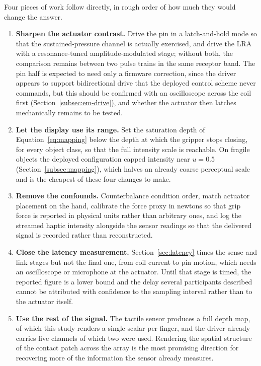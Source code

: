 \documentclass[12pt, a4paper, twoside, openright]{report}
\begin{document}
Four pieces of work follow directly, in rough order of how much they would
change the answer.

\begin{enumerate}
    \item \textbf{Sharpen the actuator contrast.} Drive the pin in a
          latch-and-hold mode so that the sustained-pressure channel is
          actually exercised, and drive the LRA with a resonance-tuned
          amplitude-modulated stage; without both, the comparison remains
          between two pulse trains in the same receptor band. The pin half is
          expected to need only a firmware correction, since the driver
          appears to support bidirectional drive that the deployed control
          scheme never commands, but this should be confirmed with an
          oscilloscope across the coil first (Section~\ref{subsec:em-drive}),
          and whether the actuator then latches mechanically remains to be
          tested.
    \item \textbf{Let the display use its range.} Set the saturation depth of
          Equation~\eqref{eq:mapping} below the depth at which the gripper
          stops closing, for every object class, so that the full intensity
          scale is reachable. On fragile objects the deployed configuration
          capped intensity near $u = 0.5$
          (Section~\ref{subsec:mapping}), which halves an already coarse
          perceptual scale and is the cheapest of these four changes to make.
    \item \textbf{Remove the confounds.} Counterbalance condition order, match
          actuator placement on the hand, calibrate the force proxy in newtons
          so that grip force is reported in physical units rather than
          arbitrary ones, and log the streamed haptic intensity alongside the
          sensor readings so that the delivered signal is recorded rather than
          reconstructed.
    \item \textbf{Close the latency measurement.} Section~\ref{sec:latency}
          times the sense and link stages but not the final one, from coil
          current to pin motion, which needs an oscilloscope or microphone at
          the actuator. Until that stage is timed, the reported figure is a
          lower bound and the delay several participants described cannot be
          attributed with confidence to the sampling interval rather than to
          the actuator itself.
    \item \textbf{Use the rest of the signal.} The tactile sensor produces a
          full depth map, of which this study renders a single scalar per
          finger, and the driver already carries five channels of which two
          were used. Rendering the spatial structure of the contact patch
          across the array is the most promising direction for recovering more
          of the information the sensor already measures.
\end{enumerate}
\end{document}
